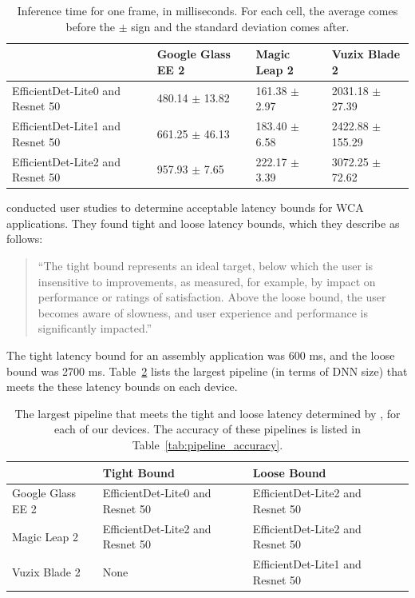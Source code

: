 \begin{table}
\begin{tabular}{|l||l|l|l|}
  \hline
  & Google Glass EE 2 & Magic Leap 2 & Vuzix Blade 2\\
  \hline
  \hline
  EfficientDet-Lite0 and Resnet 50 & 480.14 $\pm$ 13.82 & 161.38 $\pm$ 2.97 & 2031.18 $\pm$ 27.39\\
  EfficientDet-Lite1 and Resnet 50 & 661.25 $\pm$ 46.13 & 183.40 $\pm$ 6.58 & 2422.88 $\pm$ 155.29\\
  EfficientDet-Lite2 and Resnet 50 & 957.93 $\pm$ 7.65 & 222.17 $\pm$ 3.39 & 3072.25 $\pm$ 72.62\\
  \hline
\end{tabular}
  \caption{
    Inference time for one frame, in milliseconds.
    For each cell, the average comes before the $\pm$ sign and the standard
    deviation comes after.
  }\label{tab:mobile_inference}
\end{table}

\citet{chen2017} conducted user studies to determine acceptable latency bounds
for WCA applications.
They found tight and loose latency bounds, which they describe as follows:
\begin{quotation}
``The tight bound represents an ideal target, below which the
user is insensitive to improvements, as measured, for example,
by impact on performance or ratings of satisfaction. Above
the loose bound, the user becomes aware of slowness, and
user experience and performance is significantly impacted.''
\end{quotation}
The tight latency bound for an assembly application was 600 ms, and the loose
bound was 2700 ms. Table~\ref{tab:mobile_accuracy} lists the largest pipeline
(in terms of DNN size)
that meets the these latency bounds on each device.

\begin{table}
\begin{tabular}{|l||l|l|l|}
  \hline
  & Tight Bound & Loose Bound\\
  \hline
  \hline
  Google Glass EE 2 & EfficientDet-Lite0 and Resnet 50 & EfficientDet-Lite2 and Resnet 50\\
  Magic Leap 2 & EfficientDet-Lite2 and Resnet 50 & EfficientDet-Lite2 and Resnet 50\\
  Vuzix Blade 2 & None & EfficientDet-Lite1 and Resnet 50\\
  \hline
\end{tabular}
  \caption{
    The largest pipeline that meets the tight and loose latency determined by
    \citet{chen2017}, for each of our devices.
    The accuracy of these pipelines is listed in
    Table~\ref{tab:pipeline_accuracy}.
  }\label{tab:mobile_accuracy}
\end{table}

